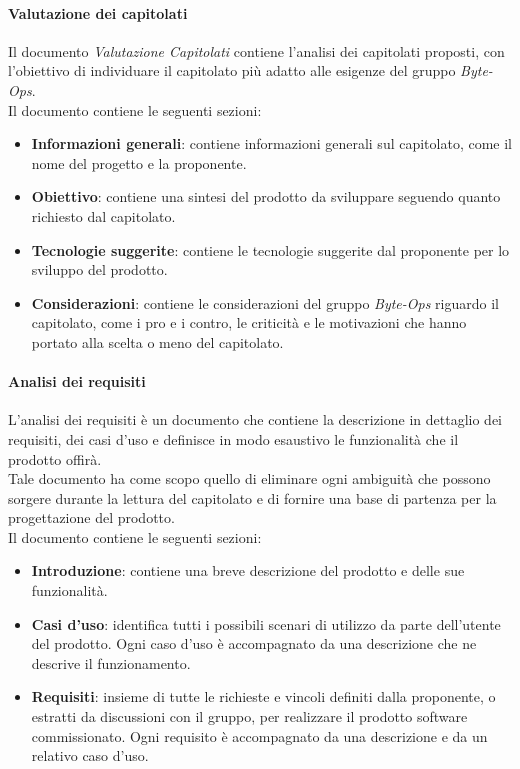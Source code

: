 \paragraph{Valutazione dei capitolati}
Il documento \textit{Valutazione Capitolati} contiene l'analisi dei capitolati proposti, con l'obiettivo di individuare il capitolato più adatto alle esigenze del gruppo \textit{Byte-Ops}.\\
Il documento contiene le seguenti sezioni:
\begin{itemize}
    \item \textbf{Informazioni generali}: contiene informazioni generali sul capitolato, come il nome del progetto e la proponente.
    \item \textbf{Obiettivo}: contiene una sintesi del prodotto da sviluppare seguendo quanto richiesto dal capitolato.
    \item \textbf{Tecnologie suggerite}: contiene le tecnologie suggerite dal proponente per lo sviluppo del prodotto.
    \item \textbf{Considerazioni}: contiene le considerazioni del gruppo \textit{Byte-Ops} riguardo il capitolato, come i pro e i contro, le criticità e le motivazioni che hanno portato alla scelta o meno del capitolato.
\end{itemize}

\paragraph{Analisi dei requisiti}
L'analisi dei requisiti è un documento che contiene la descrizione in dettaglio dei requisiti, dei casi d'uso e definisce in modo esaustivo le funzionalità che il prodotto offirà.\\
Tale documento ha come scopo quello di eliminare ogni ambiguità che possono sorgere durante la lettura del capitolato e di fornire una base di partenza per la progettazione del prodotto.\\
Il documento contiene le seguenti sezioni:
\begin{itemize}
    \item \textbf{Introduzione}: contiene una breve descrizione del prodotto e delle sue funzionalità.
    \item \textbf{Casi d'uso}: identifica tutti i possibili scenari di utilizzo da parte dell'utente del prodotto. Ogni caso d'uso è accompagnato da una descrizione che ne descrive il funzionamento.
    \item \textbf{Requisiti}: insieme di tutte le richieste e vincoli definiti dalla proponente, o estratti da discussioni con il gruppo, per realizzare il prodotto software commissionato. Ogni requisito è accompagnato da una descrizione e da un relativo caso d'uso.
\end{itemize}

